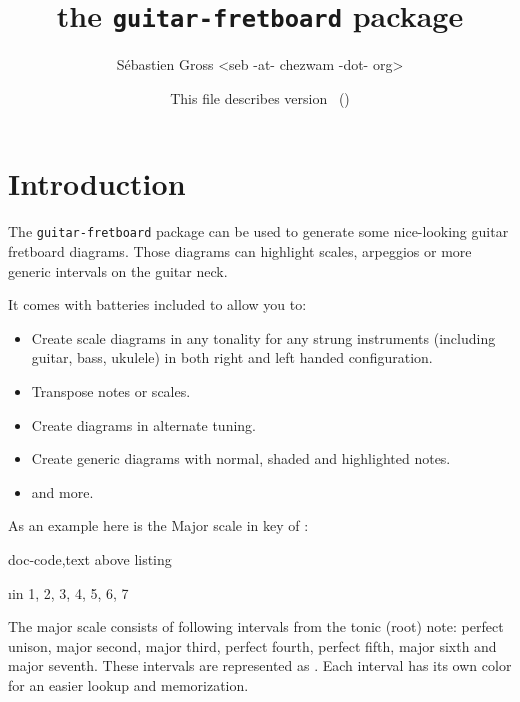 \documentclass[a4paper]{article}
\newif\ifintroduction
\newcommand{\pkg}[1]{\texttt{#1}}
\begin{document}
\title{the \pkg{guitar-fretboard} package }
\author {Sébastien Gross <seb -at- chezwam -dot- org>}
\date{This file describes version \fbfileversion\  (\fbfiledate)}
\maketitle
\tableofcontents

\ifintroduction

\section{Introduction}

The \pkg{guitar-fretboard} package can be used to generate some nice-looking
guitar fretboard diagrams. Those diagrams can highlight scales, arpeggios or
more generic intervals on the guitar neck.

It comes with batteries included to allow you to:

\begin{itemize}
  \item Create scale diagrams in any tonality for any strung instruments
    (including guitar, bass, ukulele) in both right and left handed
    configuration.
  \item Transpose notes or scales.
  \item Create diagrams in alternate tuning.
  \item Create generic diagrams with normal, shaded and highlighted notes.
  \item and more.
\end{itemize}

As an example here is the Major scale in key of \pC:

\begin{tcblisting}{doc-code,text above listing}
  \begin{fretboard}[frets before = 2, frets after = 2,
      title = {Major scale (1, 2, 3, 4, 5, 6, 7)},
      scale=0.35, fret numbers]
    \foreach \i in {1, 2, 3, 4, 5, 6, 7} {
      \FBnote[split]{\i}
    }
  \end{fretboard}
\end{tcblisting}

The major scale consists of following intervals from the tonic (root) note:
perfect unison, major second, major third, perfect fourth, perfect fifth,
major sixth and major seventh. These intervals are represented as
. Each interval has its own color for an
easier lookup and memorization.
\end{document}
